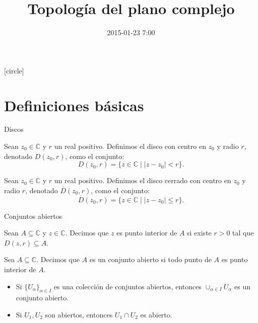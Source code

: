 \documentclass[spanish,presentation]{beamer}
\date{2015-01-23 7:00}
\title{Topología del plano complejo}
\begin{document}
\maketitle
{}
[circle]

\tableofcontents

\section{Definiciones básicas}
\label{sec-1}

\begin{frame}[label=sec-1-1]{Discos}
\begin{definition}[Disco]
Sean \(z_{0}\in\mathbb{C}\) y \(r\) un real positivo. Definimos el
\alert{disco} con centro en \(z_{0}\) y radio \(r\), denotado \(D(z_{0},r)\), como
el conjunto:
\begin{displaymath}
D(z_{0},r)=\{z\in\mathbb{C}\mid |z-z_{0}|<r\}.
\end{displaymath}
\end{definition}

\begin{definition}
Sean \(z_{0}\in\mathbb{C}\) y \(r\) un real positivo. Definimos el
\alert{disco cerrado} con centro en \(z_{0}\) y radio \(r\), denotado \(\overline{D}(z_{0},r)\), como
el conjunto:
\begin{displaymath}
\overline{D}(z_{0},r)=\{z\in\mathbb{C}\mid |z-z_{0}|\leq r\}.
\end{displaymath}   
\end{definition}
\end{frame}

\begin{frame}[label=sec-1-2]{Conjuntos abiertos}
\begin{definition}
Sean \(A\subseteq \mathbb{C}\) y \(z\in \mathbb{C}\). Decimos que
\(z\) es \alert{punto interior} de \(A\) si existe \(r>0\) tal que
\(D(z,r)\subseteq A\).
\end{definition}

\begin{definition}
Sea \(A\subseteq \mathbb{C}\). Decimos que \(A\) es un \alert{conjunto
abierto} si todo punto de \(A\) es punto interior de \(A\).
\end{definition}

\begin{theorem}
\begin{itemize}
\item Si \(\{U_{\alpha}\}_{\alpha\in I}\) es una colección de
conjuntos abiertos, entonces \(\cup_{\alpha\in I}U_{\alpha}\) es un
conjunto abierto.
\item Si \(U_{1},U_{2}\) son abiertos, entonces \(U_{1}\cap U_{2}\) es
abierto.
\end{itemize}
\end{theorem}
\end{frame}
\end{document}
